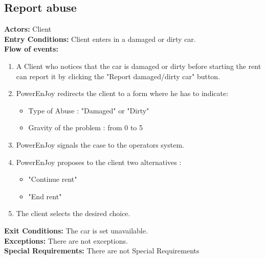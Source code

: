 \subsection{Report abuse}
%
\textbf{Actors:}
Client \\
%
\textbf{Entry Conditions:}
Client enters in a damaged or dirty car.\\
%
\textbf{Flow of events:}
\begin{enumerate}
\item A Client who notices that the car is damaged or dirty before starting the rent can report it by clicking the "Report damaged/dirty car" button.
\item PowerEnJoy redirects the client to a form where he has to indicate:
\begin{itemize}
\item Type of Abuse : "Damaged" or "Dirty" 
\item Gravity of the problem : from 0 to 5
\end{itemize}
\item PowerEnJoy signals the case to the operators system.
\item PowerEnJoy proposes to the client two alternatives :
\begin{itemize}
\item "Continue rent"
\item "End rent"
\end{itemize}
\item The client selects the desired choice.
\end{enumerate}
%
\textbf{Exit Conditions:}
The car is set unavailable.  \\
\textbf{Exceptions:}
 There are not exceptions. \\
\textbf{Special Requirements:}
 There are not Special Requirements\\

